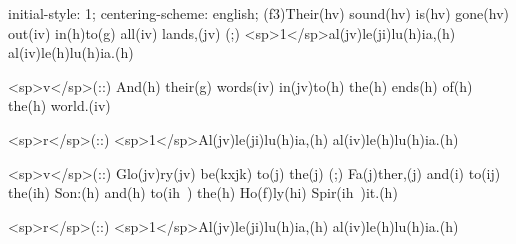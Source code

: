 initial-style: 1;
centering-scheme: english;
(f3)Their(hv) sound(hv) is(hv) gone(hv) out(iv) in(h)to(g) all(iv) lands,(jv) (;) <sp>1</sp>al(jv)le(ji)lu(h)ia,(h) al(iv)le(h)lu(h)ia.(h)

<sp>v</sp>(::) And(h) their(g) words(iv) in(jv)to(h) the(h) ends(h) of(h) the(h) world.(iv)

<sp>r</sp>(::) <sp>1</sp>Al(jv)le(ji)lu(h)ia,(h) al(iv)le(h)lu(h)ia.(h)

<sp>v</sp>(::) Glo(jv)ry(jv) be(kxjk) to(j) the(j) (;) Fa(j)ther,(j) and(i) to(ij) the(ih) Son:(h) and(h) to(ih~) the(h) Ho(f)ly(hi) Spir(ih~)it.(h)

<sp>r</sp>(::) <sp>1</sp>Al(jv)le(ji)lu(h)ia,(h) al(iv)le(h)lu(h)ia.(h)